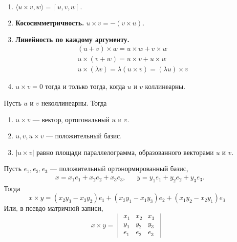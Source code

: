 \documentclass[12pt,a4paper]{article}
\begin{document}
    \begin{lemma}\ 
        \begin{enumerate}
            \item $\langle u \times v, w \rangle = [u, v, w]$.
            \item \textbf{Кососимметричность.} $u \times v = -(v \times u)$.
            \item \textbf{Линейность по каждому аргументу.}
                \begin{gather*}
                    (u + v) \times w = u \times w + v \times w\\
                    u \times (v + w) = u \times v + u \times w\\
                    u \times (\lambda v) = \lambda (u \times v) = (\lambda u) \times v
                \end{gather*}
            \item $u \times v = 0$ тогда и только тогда, когда $u$ и $v$ коллинеарны.
        \end{enumerate}
    \end{lemma}

    \begin{theorem}
        Пусть $u$ и $v$ неколлинеарны. Тогда
        \begin{enumerate}
            \item $u \times v$ --- вектор, ортогональный $u$ и $v$.
            \item $u, v, u \times v$ --- положительный базис.
            \item $|u \times v|$ равно площади параллелограмма, образованного векторами $u$ и $v$.
        \end{enumerate}
    \end{theorem}

    \begin{theorem}
        Пусть $e_1, e_2, e_3$ --- положительный ортонормированный базис,
        \begin{align*}
            &x = x_1 e_1 + x_2 e_2 + x_3 e_3,&
            &y = y_1 e_1 + y_2 e_2 + y_3 e_3.
        \end{align*}
        Тогда
        \[x \times y = (x_2 y_3 - x_3 y_2) e_1 + (x_3 y_1 - x_1 y_3) e_2 + (x_1 y_2 - x_2 y_1) e_3\]
        Или, в псевдо-матричной записи,
        \[
            x \times y =
            \begin{vmatrix}
                x_1& x_2& x_3\\
                y_1& y_2& y_3\\
                e_1& e_2& e_3
            \end{vmatrix}
        \]
    \end{theorem}
\end{document}
